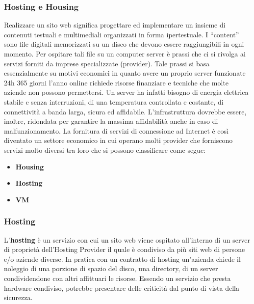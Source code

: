 \documentclass[12pt]{report}
\begin{document}
	\subsubsection{Hosting e Housing}
	Realizzare un sito web significa progettare ed implementare un insieme di contenuti testuali e multimediali organizzati in forma ipertestuale. I “content” sono file digitali memorizzati su un disco che devono essere raggiungibili in ogni momento. Per ospitare tali file su un computer server è prassi che ci si rivolga ai servizi forniti da imprese specializzate (provider). Tale prassi si basa essenzialmente su motivi economici in quanto avere un proprio server funzionate 24h 365 giorni l’anno online richiede risorse finanziare e tecniche che molte aziende non possono permettersi. Un server ha infatti bisogno di energia elettrica stabile e senza interruzioni, di una temperatura controllata e costante, di connettività a banda larga, sicura ed affidabile. L’infrastruttura dovrebbe essere, inoltre, ridondata per garantire la massima affidabilità anche in caso di malfunzionamento. La fornitura di servizi di connessione ad Internet è così diventato un settore economico in cui operano molti provider che forniscono servizi molto diversi tra loro che si possono classificare come segue:
	\begin{itemize}
		\item \textbf{Housing}
		\item \textbf{Hosting}
		\item \textbf{VM}
	\end{itemize}

	\subsubsection{Hosting}
	L’\textbf{hosting} è un servizio con cui un sito web viene ospitato all’interno di un
	server di proprietà dell’Hosting Provider il quale è condiviso da più siti web di persone e/o aziende diverse. In pratica con un contratto di
	hosting un’azienda chiede il noleggio di una porzione di spazio del disco, una directory, di un server condividendone con altri affittuari le risorse. Essendo un servizio che presta hardware condiviso, potrebbe presentare delle criticità dal punto di vista della sicurezza. 
\end{document}

